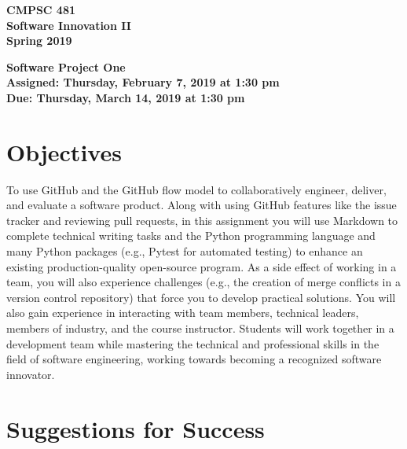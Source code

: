 \documentclass[11pt]{article}
\newcommand{\assignmentduedate}{March 14}
\newcommand{\assignmentassignedate}{February 7}
\newcommand{\assignmentnumber}{One}
\newcommand{\labyear}{2019}
\newcommand{\labdueday}{Thursday}
\newcommand{\labassignday}{Thursday}
\newcommand{\labtime}{1:30 pm}
\newcommand{\assigneddate}{Assigned: \labassignday, \assignmentassignedate, \labyear{} at \labtime{}}
\newcommand{\duedate}{Due: \labdueday, \assignmentduedate, \labyear{} at \labtime{}}
\newcommand{\labtitle}[1]
{
  \begin{center}
    \begin{center}
      \bf
      CMPSC 481\\Software Innovation II\\
      Spring 2019\\
      \medskip
    \end{center}
    \bf
    #1
  \end{center}
}
\begin{document}
\thispagestyle{empty}

\labtitle{Software Project \assignmentnumber{} \\ \assigneddate{} \\ \duedate{}}

\section*{Objectives}

To use GitHub and the GitHub flow model to collaboratively engineer, deliver,
and evaluate a software product.
%
Along with using GitHub features like the issue tracker and reviewing pull
requests, in this assignment you will use Markdown to complete technical writing
tasks and the Python programming language and many Python packages (e.g., Pytest
for automated testing) to enhance an existing production-quality open-source
program.
%
As a side effect of working in a team, you will also experience challenges
(e.g., the creation of merge conflicts in a version control repository) that
force you to develop practical solutions.
%
You will also gain experience in interacting with team members, technical
leaders, members of industry, and the course instructor.
%
Students will work together in a development team while mastering the technical
and professional skills in the field of software engineering, working towards
becoming a recognized software innovator.

\section*{Suggestions for Success}
\end{document}
